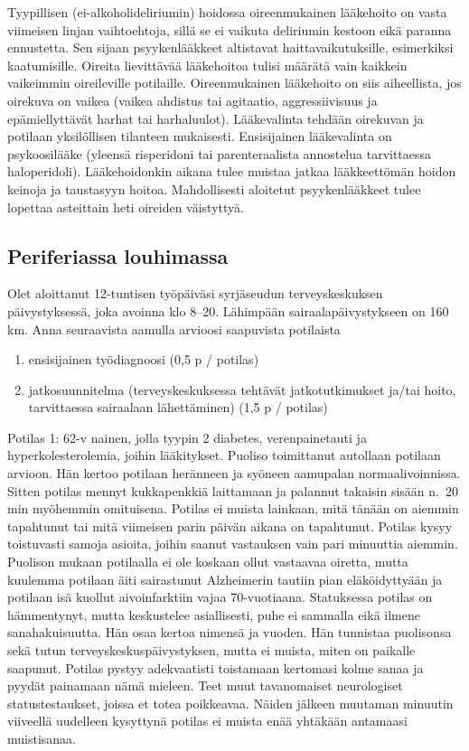 \documentclass[
]{book}
\providecommand{\tightlist}{%
  \setlength{\itemsep}{0pt}\setlength{\parskip}{0pt}}
\begin{document}
Tyypillisen (ei-alkoholideliriumin) hoidossa oireenmukainen lääkehoito on vasta viimeisen linjan vaihtoehtoja, sillä se ei vaikuta deliriumin kestoon eikä paranna ennustetta. Sen sijaan psyykenlääkkeet altistavat haittavaikutuksille, esimerkiksi kaatumisille. Oireita lievittävää lääkehoitoa tulisi määrätä vain kaikkein vaikeimmin oireileville potilaille. Oireenmukainen lääkehoito on siis aiheellista, jos oirekuva on vaikea (vaikea ahdistus tai agitaatio, aggressiivisuus ja epämiellyttävät harhat tai harhaluulot). Lääkevalinta tehdään oirekuvan ja potilaan yksilöllisen tilanteen mukaisesti. Ensisijainen lääkevalinta on psykoosilääke (yleensä risperidoni tai parenteraalista annostelua tarvittaessa haloperidoli). Lääkehoidonkin aikana tulee muistaa jatkaa lääkkeettömän hoidon keinoja ja taustasyyn hoitoa. Mahdollisesti aloitetut psyykenlääkkeet tulee lopettaa asteittain heti oireiden väistyttyä.

\subsection{Periferiassa louhimassa}\label{periferiassa-louhimassa}

Olet aloittanut 12-tuntisen työpäiväsi syrjäseudun terveyskeskuksen päivystyksessä, joka avoinna klo 8--20. Lähimpään sairaalapäivystykseen on 160 km. Anna seuraavista aamulla arvioosi saapuvista potilaista

\begin{enumerate}
\def\labelenumi{\alph{enumi})}
\tightlist
\item
  ensisijainen työdiagnoosi (0,5 p / potilas)
\item
  jatkosuunnitelma (terveyskeskuksessa tehtävät jatkotutkimukset ja/tai hoito, tarvittaessa sairaalaan lähettäminen) (1,5 p / potilas)
\end{enumerate}

Potilas 1: 62-v nainen, jolla tyypin 2 diabetes, verenpainetauti ja hyperkolesterolemia, joihin lääkitykset. Puoliso toimittanut autollaan potilaan arvioon. Hän kertoo potilaan heränneen ja syöneen aamupalan normaalivoinnissa. Sitten potilas mennyt kukkapenkkiä laittamaan ja palannut takaisin sisään n.~20 min myöhemmin omituisena. Potilas ei muista lainkaan, mitä tänään on aiemmin tapahtunut tai mitä viimeisen parin päivän aikana on tapahtunut. Potilas kysyy toistuvasti samoja asioita, joihin saanut vastauksen vain pari minuuttia aiemmin. Puolison mukaan potilaalla ei ole koskaan ollut vastaavaa oiretta, mutta kuulemma potilaan äiti sairastunut Alzheimerin tautiin pian eläköidyttyään ja potilaan isä kuollut aivoinfarktiin vajaa 70-vuotiaana. Statuksessa potilas on hämmentynyt, mutta keskustelee asiallisesti, puhe ei sammalla eikä ilmene sanahakuisuutta. Hän osaa kertoa nimensä ja vuoden. Hän tunnistaa puolisonsa sekä tutun terveyskeskuspäivystyksen, mutta ei muista, miten on paikalle saapunut. Potilas pystyy adekvaatisti toistamaan kertomasi kolme sanaa ja pyydät painamaan nämä mieleen. Teet muut tavanomaiset neurologiset statustestaukset, joissa et totea poikkeavaa. Näiden jälkeen muutaman minuutin viiveellä uudelleen kysyttynä potilas ei muista enää yhtäkään antamaasi muistisanaa.
\end{document}
